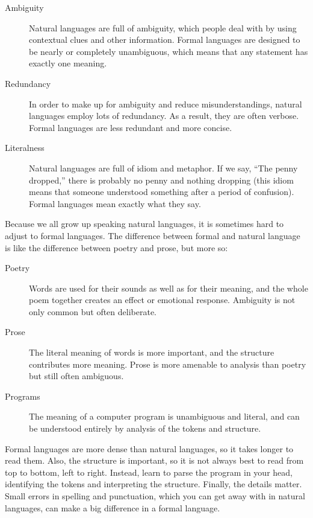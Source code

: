 \begin{description}

\item[Ambiguity] Natural languages are full of ambiguity, which
people deal with by using contextual clues and other information.
Formal languages are designed to be nearly or completely unambiguous,
which means that any statement has exactly one meaning. 

\item[Redundancy] In order to make up for ambiguity and reduce
misunderstandings, natural languages employ lots of
redundancy.  As a result, they are often verbose.  Formal languages
are less redundant and more concise.

\item[Literalness] Natural languages are full of idiom and metaphor.
If we say, ``The penny dropped,'' there is probably no penny and
nothing dropping (this idiom means that someone understood something
after a period of confusion).  Formal languages
mean exactly what they say.

\end{description}

Because we all grow up speaking natural languages, it is sometimes
hard to adjust to formal languages.  The difference between formal and
natural language is like the difference between poetry and prose, but
more so:  

\begin{description}

\item[Poetry] Words are used for their sounds as well as for
their meaning, and the whole poem together creates an effect or
emotional response.  Ambiguity is not only common but often
deliberate.

\item[Prose] The literal meaning of words is more important,
and the structure contributes more meaning.  Prose is more amenable to
analysis than poetry but still often ambiguous.

\item[Programs] The meaning of a computer program is unambiguous
and literal, and can be understood entirely by analysis of the
tokens and structure.

\end{description}

Formal languages are more dense
than natural languages, so it takes longer to read them.  Also, the
structure is important, so it is not always best to read
from top to bottom, left to right.  Instead, learn to parse the
program in your head, identifying the tokens and interpreting the
structure.  Finally, the details matter.  Small errors in
spelling and punctuation, which you can get away
with in natural languages, can make a big difference in a formal
language.


